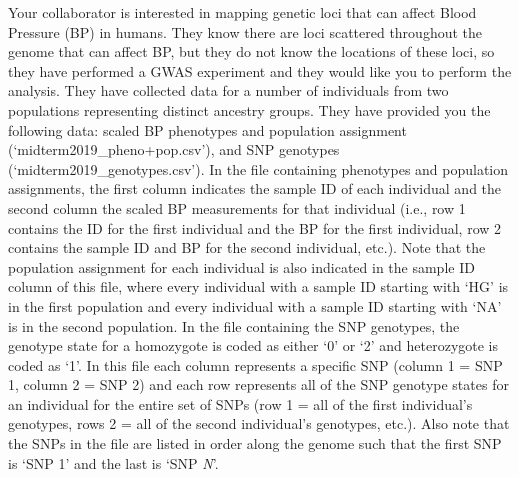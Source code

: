 \documentclass[letterpaper, 11pt]{article}
\begin{document}
\pagebreak

Your collaborator is interested in mapping genetic loci that can affect Blood Pressure (BP) in humans.  They know there are loci scattered throughout the genome that can affect BP, but they do not know the locations of these loci, so they have performed a GWAS experiment and they would like you to perform the analysis.  They have collected data for a number of individuals from two populations representing distinct ancestry groups.  They have provided you the following data: scaled BP phenotypes and population assignment (`midterm2019\_pheno+pop.csv'), and SNP genotypes (`midterm2019\_genotypes.csv').  In the file containing phenotypes and population assignments, the first column indicates the sample ID of each individual and the second column the scaled BP measurements for that individual (i.e., row 1 contains the ID for the first individual and the BP for the first individual, row 2 contains the sample ID and BP for the second individual, etc.).  Note that the population assignment for each individual is also indicated in the sample ID column of this file, where every individual with a sample ID starting with `HG' is in the first population and every individual with a sample ID starting with `NA' is in the second population.  In the file containing the SNP genotypes, the genotype state for a homozygote is coded as either `0' or `2' and heterozygote is coded as `1'.  In this file each column represents a specific SNP (column 1 = SNP 1, column 2 = SNP 2) and each row represents all of the SNP genotype states for an individual for the entire set of SNPs (row 1 = all of the first individual's genotypes, rows 2 = all of the second individual's genotypes, etc.).  Also note that the SNPs in the file are listed in order along the genome such that the first SNP is `SNP 1' and the last is `SNP \textit{N}'.
\end{document}
